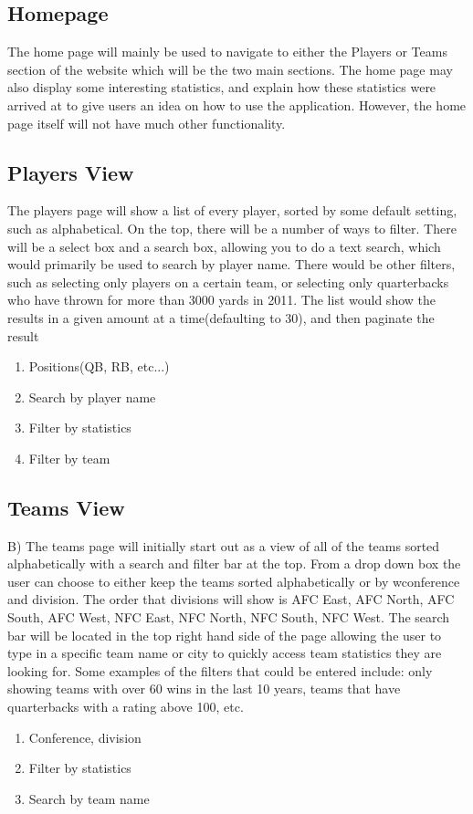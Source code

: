 \documentclass[12pt,letterpaper]{article}
\begin{document}
\subsection{Homepage}
The home page will mainly be used to navigate to either the Players or Teams section of the website which will be the two main sections. The home page may also display some interesting statistics, and explain how these statistics were arrived at to give users an idea on how to use the application. However, the home page itself will not have much other functionality.

\subsection{Players View}
The players page will show a list of every player, sorted by some default setting, such as alphabetical. On the top, there will be a number of ways to filter. There will be a select box and a search box, allowing you to do a text search, which would primarily be used to search by player name.  There would be other filters, such as selecting only players on a certain team, or selecting only quarterbacks who have thrown for more than 3000 yards in 2011. The list would show the results in a given amount at a time(defaulting to 30), and then paginate the result
\begin{enumerate} 
\item Positions(QB, RB, etc...)
\item Search by player name
\item Filter by statistics
\item Filter by team
\end{enumerate}

\subsection{Teams View}
B) The teams page will initially start out as a view of all of the teams sorted alphabetically with a search and filter bar at the top.  From a drop down box the user can choose to either keep the teams sorted alphabetically or by wconference and division. The order that divisions will show is AFC East, AFC North, AFC South, AFC West, NFC East, NFC North, NFC South, NFC West.  The search bar will be located in the top right hand side of the page allowing the user to type in a specific team name or city to quickly access team statistics they are looking for.  Some examples of the filters that could be entered include: only showing teams with over 60 wins in the last 10 years, teams that have quarterbacks with a rating above 100, etc.  
\begin{enumerate}
\item Conference, division
\item Filter by statistics
\item Search by team name
\end{enumerate}
\end{document}
